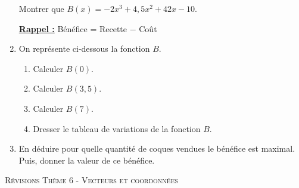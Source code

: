 \documentclass[a4paper]{article}
\begin{document}
\begin{exercice}{}{}
\begin{enumerate}
        Montrer que $B(x) = -2x^3 + 4,5x^2 + 42x - 10$.

        \underline{\bf Rappel :} Bénéfice = Recette $-$ Coût


        \item On représente ci-dessous la fonction $B$.
      \vspace{2mm}
      
     
      \begin{center}
    \end{center}

      \begin{enumerate}
        \item Calculer $B(0)$.
        \item Calculer $B(3,5)$.
        \item Calculer $B(7)$.
        \item Dresser le tableau de variations de la fonction $B$.
      \end{enumerate}
      \item En déduire pour quelle quantité de coques vendues le bénéfice est maximal. Puis, donner la valeur de ce bénéfice.

      \end{enumerate}
            

    \end{exercice}
  \pagebreak



  \begin{center}
      {\scshape\LARGE Révisions Thème 6 - Vecteurs et coordonnées\par}
      \vspace{0.5cm}
    \end{center}
  
    \setcounter{exercice}{0}
\end{document}
